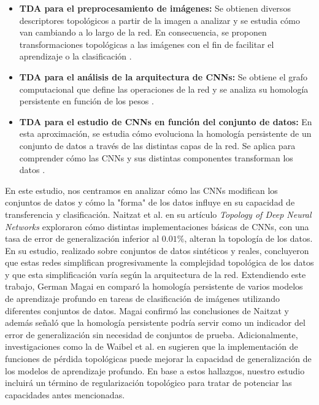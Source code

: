 \begin{itemize}
	\item \textbf{TDA para el preprocesamiento de imágenes:} Se obtienen diversos descriptores topológicos a partir de la imagen a analizar y se estudia cómo van cambiando a lo largo de la red. En consecuencia, se proponen transformaciones topológicas a las imágenes con el fin de facilitar el aprendizaje o la clasificación \cite{garin2019topological}.
	
	\item \textbf{TDA para el análisis de la arquitectura de CNNs:} Se obtiene el grafo computacional que define las operaciones de la red y se analiza su homología persistente en función de los pesos \cite{chowdhury2018persistent}.
	
	\item \textbf{TDA para el estudio de CNNs en función del conjunto de datos:} En esta aproximación, se estudia cómo evoluciona la homología persistente de un conjunto de datos a través de las distintas capas de la red. Se aplica para comprender cómo las CNNs y sus distintas componentes transforman los datos \cite{naitzat2020topology}.  
\end{itemize}

En este estudio, nos centramos en analizar cómo las CNNs modifican los conjuntos de datos y cómo la "forma" de los datos influye en su capacidad de transferencia y clasificación. Naitzat et al. en su artículo \textit{Topology of Deep Neural Networks} \cite{naitzat2020topology} exploraron cómo distintas implementaciones básicas de CNNs, con una tasa de error de generalización inferior al $0.01\%$, alteran la topología de los datos. En su estudio, realizado sobre conjuntos de datos sintéticos y reales, concluyeron que estas redes simplifican progresivamente la complejidad topológica de los datos y que esta simplificación varía según la arquitectura de la red. Extendiendo este trabajo, German Magai en \cite{magai2023deep} comparó la homología persistente de varios modelos de aprendizaje profundo en tareas de clasificación de imágenes utilizando diferentes conjuntos de datos. Magai confirmó las conclusiones de Naitzat y además señaló que la homología persistente podría servir como un indicador del error de generalización sin necesidad de conjuntos de prueba. Adicionalmente, investigaciones como la de Waibel et al. en \cite{waibel2022capturing} sugieren que la implementación de funciones de pérdida topológicas puede mejorar la capacidad de generalización de los modelos de aprendizaje profundo. En base a estos hallazgos, nuestro estudio incluirá un término de regularización topológico para tratar de potenciar las capacidades antes mencionadas.

\endinput
